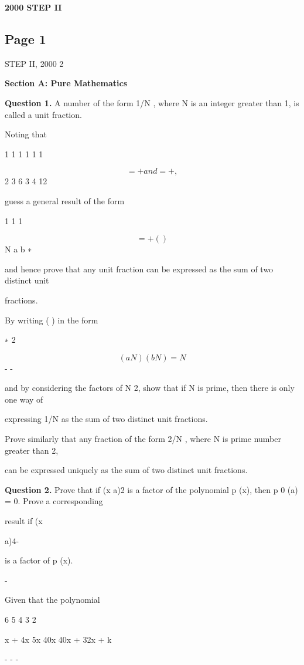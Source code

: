 \documentclass[12pt]{article}
\begin{document}
\begin{center}
{\Large \textbf{2000 STEP II}}
\end{center}

\subsection*{Page 1}
\begin{flushleft}
STEP II, 2000 2\par
\bigskip\textbf{Section A: Pure Mathematics}\par
\bigskip\textbf{Question 1.} A number of the form 1/N , where N is an integer greater than 1, is called a unit fraction.\par
Noting that\par
1 1 1 1 1 1\par
\[= + and = + ,\]
2 3 6 3 4 12\par
guess a general result of the form\par
1 1 1\par
\[= + ( )\]
N a b ∗\par
and hence prove that any unit fraction can be expressed as the sum of two distinct unit\par
fractions.\par
By writing ( ) in the form\par
∗ 2\par
\[(a N )(b N ) = N\]
- -\par
and by considering the factors of N 2, show that if N is prime, then there is only one way of\par
expressing 1/N as the sum of two distinct unit fractions.\par
Prove similarly that any fraction of the form 2/N , where N is prime number greater than 2,\par
can be expressed uniquely as the sum of two distinct unit fractions.\par
\bigskip\textbf{Question 2.} Prove that if (x a)2 is a factor of the polynomial p (x), then p 0 (a) = 0. Prove a corresponding\par
result if (x\par
a)4-\par
is a factor of p (x).\par
-\par
Given that the polynomial\par
6 5 4 3 2\par
x + 4x 5x 40x 40x + 32x + k\par
- - -\par

\end{flushleft}
\end{document}

